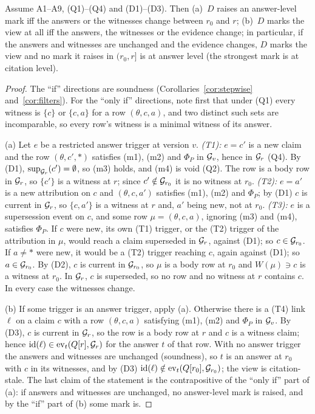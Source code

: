 \begin{proposition}\label{prop:s-exactness}
Assume A1--A9, (Q1)--(Q4) and (D1)--(D3). Then (a)~$D$ raises an answer-level mark iff the
answers or the witnesses change between $r_0$ and $r$; (b)~$D$ marks the view at all iff the
answers, the witnesses or the evidence change; in particular, if the answers and witnesses are
unchanged and the evidence changes, $D$ marks the view and no mark it raises in $(r_0,r]$ is at
answer level (the strongest mark is at citation level).
\end{proposition}
\begin{proof}
The ``if'' directions are soundness (Corollaries~\ref{cor:stepwise} and~\ref{cor:filters}). For
the ``only if'' directions, note first that under (Q1) every witness is $\{c\}$ or $\{c,a\}$ for a
row $(\theta,c,a)$, and two distinct such sets are incomparable, so every row's witness is a
minimal witness of its answer.

(a) Let $e$ be a restricted answer trigger at version $v$.
\emph{(T1):} $e=c'$ is a new claim and the row $(\theta,c',\ast)$ satisfies (m1), (m2) and
$\Phi_P$ in $\mathcal G_v$, hence in $\mathcal G_r$ (Q4). By (D1), $\mathrm{sup}_{\mathcal G_r}(c')=\emptyset$, so (m3) holds, and
(m4) is void (Q2). The row is a body row in $\mathcal G_r$, so $\{c'\}$ is a witness at $r$; since $c'\notin
\mathcal G_{r_0}$ it is no witness at $r_0$.
\emph{(T2):} $e=a'$ is a new attribution on $c$ and $(\theta,c,a')$ satisfies (m1), (m2) and
$\Phi_P$; by (D1) $c$ is current in $\mathcal G_r$, so $\{c,a'\}$ is a witness at $r$ and, $a'$ being new,
not at $r_0$.
\emph{(T3):} $e$ is a supersession event on $c$, and some row $\mu=(\theta,c,a)$, ignoring (m3)
and (m4), satisfies $\Phi_P$. If $c$ were new, its own (T1) trigger, or the (T2) trigger of the
attribution in $\mu$, would reach a claim superseded in $\mathcal G_r$, against (D1); so $c\in\mathcal G_{r_0}$. If
$a\neq\ast$ were new, it would be a (T2) trigger reaching $c$, again against (D1); so
$a\in\mathcal G_{r_0}$. By (D2), $c$ is current in $\mathcal G_{r_0}$, so $\mu$ is a body row at $r_0$ and
$W(\mu)\ni c$ is a witness at $r_0$. In $\mathcal G_r$, $c$ is superseded, so no row and no witness at $r$
contains $c$.
In every case the witnesses change.

(b) If some trigger is an answer trigger, apply (a). Otherwise there is a (T4) link $\ell$ on a
claim $c$ with a row $(\theta,c,a)$ satisfying (m1), (m2) and $\Phi_P$ in $\mathcal G_v$. By (D3), $c$ is
current in $\mathcal G_r$, so the row is a body row at $r$ and $c$ is a witness claim; hence
$\mathrm{id}(\ell)\in\mathrm{ev}_t(Q[r],\mathcal G_r)$ for the answer $t$ of that row. With no answer
trigger the answers and witnesses are unchanged (soundness), so $t$ is an answer at $r_0$ with $c$
in its witnesses, and by (D3) $\mathrm{id}(\ell)\notin\mathrm{ev}_t(Q[r_0],\mathcal G_{r_0})$; the view is
citation-stale.
The last claim of the statement is the contrapositive of the ``only if'' part of (a): if answers
and witnesses are unchanged, no answer-level mark is raised, and by the ``if'' part of (b) some
mark is.
\end{proof}


